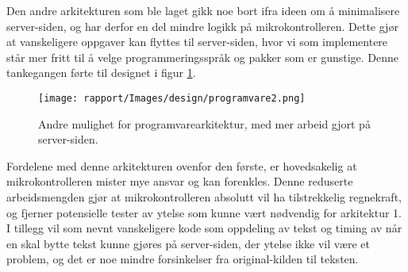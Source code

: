 Den andre arkitekturen som ble laget gikk noe bort ifra ideen om å minimalisere server-siden, og har derfor en del mindre logikk på mikrokontrolleren. Dette gjør at vanskeligere oppgaver kan flyttes til server-siden, hvor vi som implementere står mer fritt til å velge programmeringsspråk og pakker som er gunstige. Denne tankegangen førte til designet i figur \ref{fig:programvare2}.

\begin{figure}[H]
    \centering
    \texttt{[image: rapport/Images/design/programvare2.png]}
    \caption{Andre mulighet for programvarearkitektur, med mer arbeid gjort på server-siden.}
    \label{fig:programvare2}
\end{figure}

Fordelene med denne arkitekturen ovenfor den første, er hovedsakelig at mikrokontrolleren mister mye ansvar og kan forenkles. Denne reduserte arbeidsmengden gjør at mikrokontrolleren absolutt vil ha tilstrekkelig regnekraft, og fjerner potensielle tester av ytelse som kunne vært nødvendig for arkitektur 1. I tillegg vil som nevnt vanskeligere kode som oppdeling av tekst og timing av når en skal bytte tekst kunne gjøres på server-siden, der ytelse ikke vil være et problem, og det er noe mindre forsinkelser fra original-kilden til teksten.
